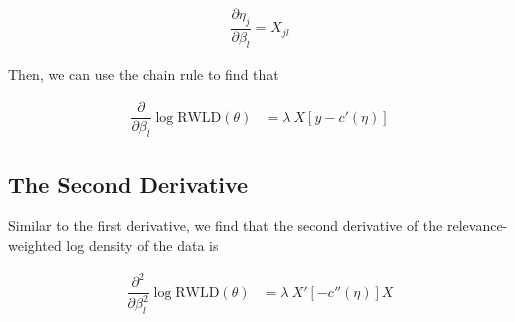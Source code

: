 \documentclass{article}
\begin{document}
\begin{align}
\dfrac{\partial \eta_j}{\partial \beta_l} = X_{jl}
\end{align}

\noindent Then, we can use the chain rule to find that

\begin{align}
\dfrac{\partial}{\partial \beta_l} \log \text{RWLD}(\theta) &= \lambda \ X \left[ y- c'(\eta) \right]
\end{align}

\subsection{The Second Derivative}

Similar to the first derivative, we find that the second derivative of the relevance-weighted log density of the data is 

\begin{align}
\dfrac{\partial^2}{\partial \beta_l^2} \log \text{RWLD}(\theta) &= \lambda \ X' \left[- c''(\eta) \right] X
\end{align}
\end{document}
